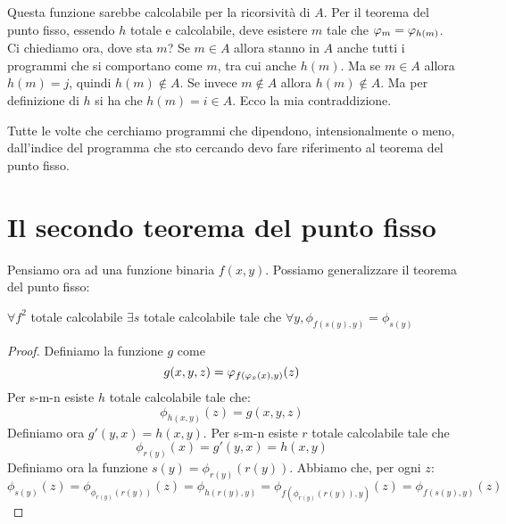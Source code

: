 Questa funzione sarebbe calcolabile per la ricorsività di $A$. Per il teorema del punto fisso,
essendo $h$ totale e calcolabile, deve esistere $m$ tale che $\varphi_{m} = \varphi_{h(m)}$. Ci chiediamo ora,
dove sta $m$? Se $m \in A$ allora stanno in $A$ anche tutti i programmi che si comportano come $m$,
tra cui anche $h(m)$. Ma se $m \in A$ allora $h(m) = j$, quindi $h(m) \notin A$. Se invece $m \notin
A$ allora $h(m) \notin A$. Ma per definizione di $h$ si ha che $h(m) = i \in A$. Ecco la mia
contraddizione.

Tutte le volte che cerchiamo programmi che dipendono, intensionalmente o meno, dall'indice del
programma che sto cercando devo fare riferimento al teorema del punto fisso.

\section{Il secondo teorema del punto fisso}

Pensiamo ora ad una funzione binaria $f(x,y)$. Possiamo generalizzare il teorema del punto fisso:
\begin{thm}
    $\forall f^{2}$ totale calcolabile $\exists s$ totale calcolabile tale che $\forall y, \phi_{f(s(y),y)} = \phi_{s(y)}$
\end{thm}
\begin{proof}
    Definiamo la funzione $g$ come
    \begin{equation*}
         g(x,y,z) = \varphi_{f(\varphi_{x}(x),y)}(z)
    \end{equation*}
    Per s-m-n esiste $h$ totale calcolabile tale che:
    \begin{equation*}
        \phi_{h(x,y)}(z) = g(x,y,z)
    \end{equation*}
    Definiamo ora $g'(y,x) = h(x,y)$. Per s-m-n esiste $r$ totale calcolabile tale che
    \begin{equation*}
        \phi_{r(y)}(x) = g'(y,x) = h(x,y)
    \end{equation*}
    Definiamo ora la funzione $s(y) = \phi_{r(y)}(r(y))$. Abbiamo che, per ogni $z$:
    \begin{equation*}
        \phi_{s(y)}(z) = \phi_{\phi_{r(y)}(r(y))}(z) = \phi_{h(r(y),y)} =
        \phi_{f(\phi_{r(y)}(r(y)),y)}(z) = \phi_{f(s(y),y)}(z)
    \end{equation*}
\end{proof}
